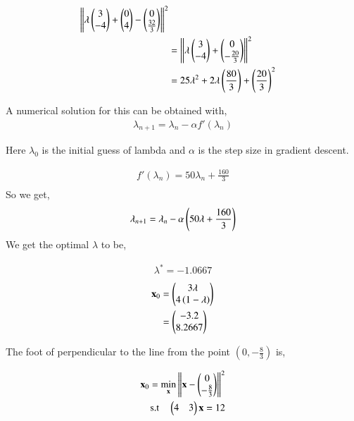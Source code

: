 \documentclass[journal,12pt,twocolumn]{IEEEtran}
\begin{document}
\begin{enumerate}
		\begin{align}
			\left\lVert\lambda \begin{pmatrix}3\\-4\end{pmatrix}+\begin{pmatrix}0\\4\end{pmatrix}-\begin{pmatrix}0\\\frac{32}{3}\end{pmatrix}\right\rVert^2\\
			&= \left\lVert\lambda \begin{pmatrix}3\\-4\end{pmatrix}+\begin{pmatrix}0\\-\frac{20}{3}\end{pmatrix}\right\rVert^2\\
			&= 25\lambda^2 +2\lambda \left(\frac{80}{3}\right)+\left(\frac{20}{3}\right)^2
		\end{align}

A numerical solution for this can be obtained with,
		\begin{align}
			\lambda_{n+1} = \lambda_n - \alpha f'(\lambda_n)
		\end{align}

Here $\lambda_0$ is the initial guess of lambda and $\alpha$ is the step size in gradient descent.

		\begin{align}
			f'(\lambda_n) = 50\lambda_n+\frac{160}{3}\\
		\end{align}
So we get,
		\begin{align}
			\lambda_{n+1} = \lambda_n - \alpha \left(50\lambda+\frac{160}{3}\right) 
		\end{align}
We get the optimal $\lambda$ to be,

		\begin{align}
			\lambda^* = -1.0667
		\end{align}
\begin{align}
	\mathbf{x}_0 &= \begin{pmatrix}3\lambda\\4\left(1-\lambda\right)\end{pmatrix}\\
		  &=\begin{pmatrix}-3.2\\8.2667\end{pmatrix}
\end{align}

		\begin{table}[h]
			\centering
			
			\caption{}
			\label{tab:1}
		\end{table}
		
The foot of perpendicular to the line from the point $(0,-\frac{8}{3})$ is,

		\begin{align}
			\mathbf{x}_0 = \min_{\mathbf{x}} \left\lVert\mathbf{x}-\begin{pmatrix}0\\-\frac{8}{3}\end{pmatrix}\right\rVert^2\\
			\text{s.t} \quad \begin{pmatrix}4 & 3\end{pmatrix}\mathbf{x} = 12
		\end{align}


\end{enumerate}
\end{document}
